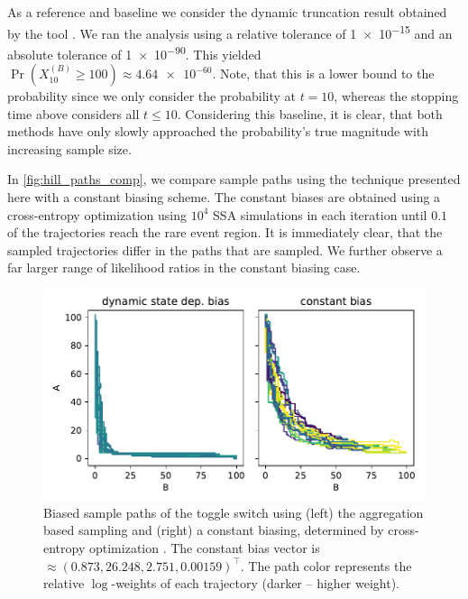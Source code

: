 As a reference and baseline we consider the dynamic truncation result obtained by the  tool \parencite{lapin2011shave}.
We ran the analysis using a relative tolerance of \num{1e-15} and an absolute tolerance of \num{1e-90}.
This yielded \(\Pr(X_{10}^{(B)} \geq 100) \approx \num{4.64e-60}\).
Note, that this is a lower bound to the probability since we only consider the probability at $t=10$, whereas the stopping time above considers all $t\leq 10$.
Considering this baseline, it is clear, that both methods have only slowly approached the probability's true magnitude with increasing sample size.

In \autoref{fig:hill_paths_comp}, we compare sample paths using the technique presented here with a constant biasing scheme.
The constant biases are obtained using a cross-entropy optimization using $10^4$ \ac{SSA} simulations in each iteration until $0.1$ of the trajectories reach the rare event region.
It is immediately clear, that the sampled trajectories differ in the paths that are sampled.
We further observe a far larger range of likelihood ratios in the constant biasing case.
\begin{figure}[htb]
    \centering
    \includegraphics[scale=.6]{gfx/hill_paths_comp.pdf}
    \caption[Comparison of biased sample paths]{\label{fig:hill_paths_comp}Biased sample paths of the toggle switch using (left) the aggregation based sampling and (right) a constant biasing, determined by cross-entropy optimization \parencite{daigle2011automated}. The constant bias vector is $\approx (0.873, 26.248, 2.751, 0.00159)^{\top}$. The path color represents the relative $\log$-weights of each trajectory (darker -- higher weight).}
\end{figure}

